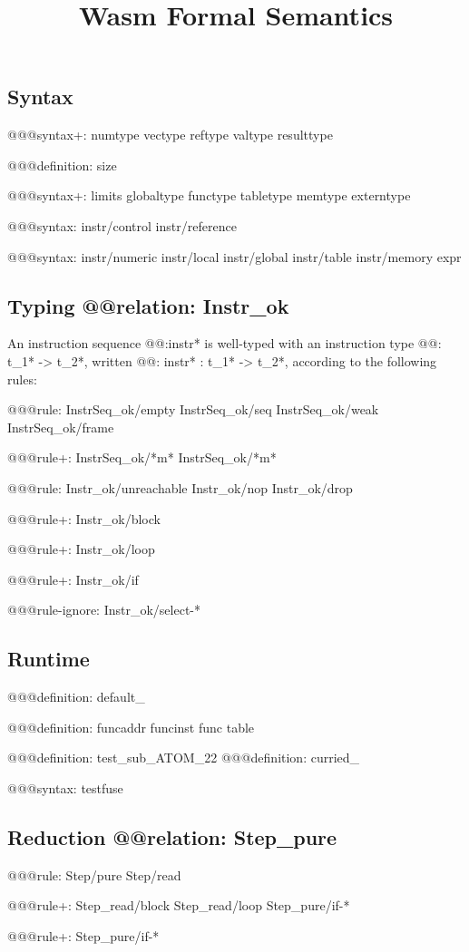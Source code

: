 \documentclass[a4paper]{scrartcl}
\title{Wasm Formal Semantics}
\begin{document}
\small

\maketitle


\subsection*{Syntax}

@@@{syntax+: {numtype vectype reftype valtype} resulttype}

@@@{definition: size}

@@@{syntax+:
  limits
  {globaltype
  functype
  tabletype
  memtype}
  {}
  externtype
}

@@@{syntax: {instr/control instr/reference}}

@@@{syntax: {instr/numeric instr/local instr/global instr/table instr/memory} expr}


\subsection*{Typing @@{relation: Instr_ok}}

An instruction sequence @@{:instr*} is well-typed with an instruction type @@{: t_1* -> t_2*}, written @@{: instr* : t_1* -> t_2*}, according to the following rules:

@@@{rule:
  {InstrSeq_ok/empty InstrSeq_ok/seq}
  {InstrSeq_ok/weak InstrSeq_ok/frame}
}

@@@{rule+: InstrSeq_ok/*m* {InstrSeq_ok/*m*}}

@@@{rule: {Instr_ok/unreachable Instr_ok/nop Instr_ok/drop}}

@@@{rule+: Instr_ok/block}

@@@{rule+: Instr_ok/loop}

@@@{rule+: Instr_ok/if}


@@@{rule-ignore: Instr_ok/select-*}


\subsection*{Runtime}

@@@{definition: default_}

@@@{definition: {funcaddr funcinst} {func table}}

@@@{definition: test_sub_ATOM_22}
@@@{definition: curried_}

@@@{syntax: testfuse}


\subsection*{Reduction @@{relation: Step_pure}}

@@@{rule: Step/pure Step/read}

@@@{rule+: {Step_read/block Step_read/loop} {Step_pure/if-*}}

@@@{rule+: Step_pure/if-*}
\end{document}

